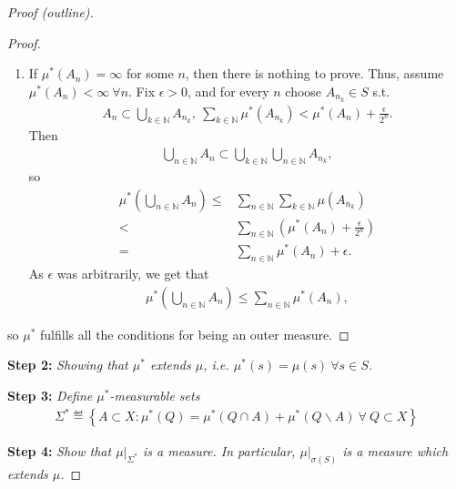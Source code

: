 \begin{proof}[Proof (outline)]
\begin{proof}
\begin{enumerate}
            \item If \(\mu^{*}(A_n) = \infty\) for some \(n\), then there is nothing to prove. Thus, assume \(\mu^{*}(A_n) < \infty \ \forall n\).
            Fix \(\epsilon > 0\), and for every \(n\) choose \(A_{n_k}\in S\) s.t.
            \begin{align*}
                A_n \subset \bigcup\limits_{k\in\mathbb{N}} A_{n_k}, \ 
                \sum\limits_{k\in\mathbb{N}}\mu^{*}(A_{n_k}) < \mu^{*}(A_n) + \frac{\epsilon}{2^n}.
            \end{align*}
            Then
            \begin{align*}
                \bigcup\limits_{n\in\mathbb{N}} A_n \subset \bigcup\limits_{k\in\mathbb{N}}\bigcup\limits_{n\in\mathbb{N}} A_{n_k},
            \end{align*}
            so 
            \begin{align*}
                \mu^{*}\left( \bigcup\limits_{n\in\mathbb{N}} A_n\right) \leq& \sum\limits_{n\in\mathbb{N}}\sum\limits_{k\in\mathbb{N}}\mu\left(A_{n_k}\right) \\
                <& \sum\limits_{n\in\mathbb{N}}\left( \mu^{*}(A_n) + \frac{\epsilon}{2^n}\right) \\ 
                =& \sum\limits_{n\in\mathbb{N}}\mu^{*}(A_n) + \epsilon.
            \end{align*}
            As \(\epsilon\) was arbitrarily, we get that
            \begin{align*}
                \mu^{*}\left( \bigcup\limits_{n\in\mathbb{N}} A_n\right) \leq \sum\limits_{n\in\mathbb{N}}\mu^{*}(A_n),
            \end{align*}
        \end{enumerate}
        so \(\mu^{*}\) fulfills all the conditions for being an outer measure.
    \end{proof}
    \textbf{Step 2:} \emph{Showing that \(\mu^{*}\) extends \(\mu\), i.e. \(\mu^{*}(s) = \mu(s) \ \forall s\in S\).}
    
    \textbf{Step 3:} \emph{Define \(\mu^{*}\)-measurable sets}
    \begin{align*}
        \Sigma^{*} \eqdef \left\{ A \subset X: \mu^{*}(Q) = \mu^{*}(Q\cap A) + \mu^{*}(Q \backslash A) \ \forall \ Q \subset X \right\}
    \end{align*}

    \textbf{Step 4:} \emph{Show that \(\mu\vert_{\Sigma^{*}}\) is a measure. In particular, \(\mu\vert_{\sigma(S)}\) is a measure which extends \(\mu\).}
    
\end{proof}